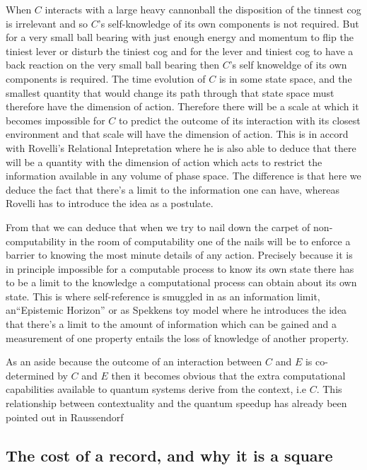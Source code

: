 When $C$ interacts with a large heavy cannonball the disposition of the tinnest cog is
irrelevant and so $C$'s self-knowledge of its own components is not required. But for a very
small ball bearing with just enough energy and momentum to flip the tiniest lever or disturb the
tiniest cog and for the lever and tiniest cog to have a back reaction on the very small ball
bearing then $C$'s self knoweldge of its own components is required. The time evolution of $C$
is in some state space, and the smallest quantity that would change its path through that state
space must therefore have the dimension of action. Therefore there will be a scale at which it
becomes impossible for $C$ to predict the outcome of its interaction with its closest
environment and that scale will have the dimension of action. This is in accord with Rovelli's
Relational Intepretation \autocite{Rovelli1996a} where he is also able to deduce that there will
be a quantity with the dimension of action which acts to restrict the information available in
any volume of phase space. The difference is that here we deduce the fact that there's a limit
to the information one can have, whereas Rovelli has to introduce the idea as a postulate.

From that we can deduce that when we try to nail down the carpet of non-computability in the
room of computability one of the nails will be to enforce a barrier to knowing the most minute
details of any action. Precisely because it is in principle impossible for a computable process
to know its own state there has to be a limit to the knowledge a computational process can
obtain about its own state. This is where self-reference is smuggled in as an information limit,
an\enquote{Epistemic Horizon} \autocite{szangolies_j_2018, szangolies_2020} or as Spekkens toy
model \autocite{spekkens2007toy} where he introduces the idea that there's a limit to the amount
of information which can be gained and a measurement of one property entails the loss of
knowledge of another property.

As an aside because the outcome of an interaction between $C$ and $E$ is co-determined by $C$
and $E$ then it becomes obvious that the extra computational capabilities available to quantum
systems derive from the context, i.e $C$. This relationship between contextuality and the
quantum speedup has already been pointed out in Raussendorf
\autocite{Raussendorf2009ContextualityComputation}

\subsection{The cost of a record, and why it is a square}
\label{sec:born-cost-ledger}

